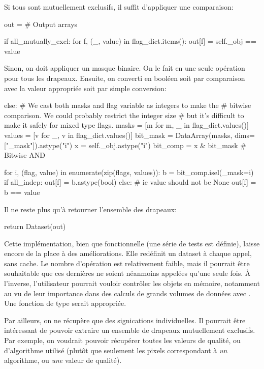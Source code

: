 Si tous sont mutuellement exclusifs, il suffit d'appliquer une comparaison:
\begin{pythonMiddle}[]
    out = {}  # Output arrays

    if all_mutually_excl:
        for f, (_, value) in flag_dict.items():
            out[f] = self._obj == value
\end{pythonMiddle}

Sinon, on doit appliquer un masque binaire. On le fait en une seule opération pour tous les drapeaux.
Ensuite, on converti en booléen soit par comparaison avec la valeur appropriée soit par simple conversion:
\begin{pythonMiddle}[]
    else:
        # We cast both masks and flag variable as integers to make the
        # bitwise comparison. We could probably restrict the integer size
        # but it's difficult to make it safely for mixed type flags.
        masks = [m for m, _ in flag_dict.values()]
        values = [v for _, v in flag_dict.values()]
        bit_mask = DataArray(masks, dims=["_mask"]).astype("i")
        x = self._obj.astype("i")
        bit_comp = x & bit_mask  # Bitwise AND

        for i, (flag, value) in enumerate(zip(flags, values)):
            b = bit_comp.isel(_mask=i)
            if all_indep:
                out[f] = b.astype(bool)
            else:  # ie value should not be None
                out[f] = b == value
\end{pythonMiddle}

Il ne reste plus qu'à retourner l'ensemble des drapeaux:
\begin{pythonLast}[]
    return Dataset(out)
\end{pythonLast}

Cette implémentation, bien que fonctionnelle (une série de tests est définie), laisse encore de la place à des améliorations.
Elle redéfinit un dataset à chaque appel, sans cache. Le nombre d'opération est relativement faible, mais il pourrait être souhaitable que ces dernières ne soient néanmoins appelées qu'une seule fois.
À l'inverse, l'utilisateur pourrait vouloir contrôler les objets en mémoire, notamment au vu de leur importance dans des calculs de grands volumes de données avec . Une fonction de type  serait appropriée.

Par ailleurs, on ne récupère que des signications individuelles. Il pourrait être intéressant de pouvoir extraire un ensemble de drapeaux mutuellement exclusifs.
Par exemple, on voudrait pouvoir récupérer toutes les valeurs de qualité, ou d'algorithme utilisé (plutôt que seulement les pixels correspondant à \emph{un} algorithme, ou \emph{une} valeur de qualité).

